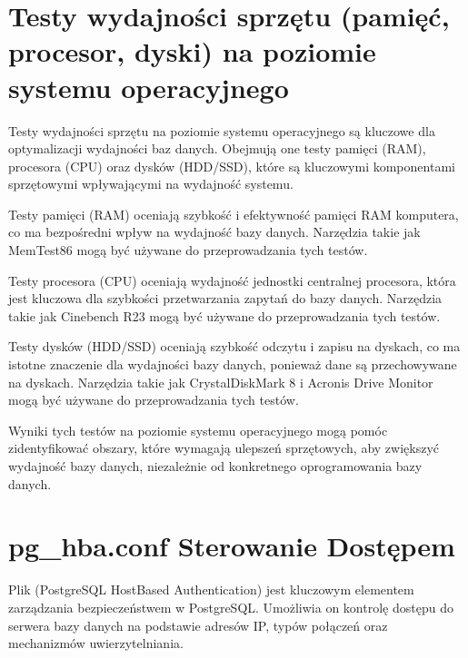 \documentclass[letterpaper,10pt,polish]{sphinxmanual}
\begin{document}
\chapter{Testy wydajności sprzętu (pamięć, procesor, dyski) na poziomie systemu operacyjnego}
\label{\detokenize{rozdzialy/rozdzial7:testy-wydajnosci-sprzetu-pamiec-procesor-dyski-na-poziomie-systemu-operacyjnego}}\label{\detokenize{rozdzialy/rozdzial7::doc}}
\sphinxAtStartPar
Testy wydajności sprzętu na poziomie systemu operacyjnego są kluczowe dla optymalizacji wydajności baz danych. Obejmują one testy pamięci (RAM), procesora (CPU) oraz dysków (HDD/SSD), które są kluczowymi komponentami sprzętowymi wpływającymi na wydajność systemu.

\sphinxAtStartPar
Testy pamięci (RAM) oceniają szybkość i efektywność pamięci RAM komputera, co ma bezpośredni wpływ na wydajność bazy danych. Narzędzia takie jak MemTest86 mogą być używane do przeprowadzania tych testów.

\sphinxAtStartPar
Testy procesora (CPU) oceniają wydajność jednostki centralnej procesora, która jest kluczowa dla szybkości przetwarzania zapytań do bazy danych. Narzędzia takie jak Cinebench R23 mogą być używane do przeprowadzania tych testów.

\sphinxAtStartPar
Testy dysków (HDD/SSD) oceniają szybkość odczytu i zapisu na dyskach, co ma istotne znaczenie dla wydajności bazy danych, ponieważ dane są przechowywane na dyskach. Narzędzia takie jak CrystalDiskMark 8 i Acronis Drive Monitor mogą być używane do przeprowadzania tych testów.

\sphinxAtStartPar
Wyniki tych testów na poziomie systemu operacyjnego mogą pomóc zidentyfikować obszary, które wymagają ulepszeń sprzętowych, aby zwiększyć wydajność bazy danych, niezależnie od konkretnego oprogramowania bazy danych.

\sphinxstepscope


\chapter{pg\_hba.conf \sphinxhyphen{} Sterowanie Dostępem}
\label{\detokenize{sprawozdanie/source/rozdzialy/rozdzial1:pg-hba-conf-sterowanie-dostepem}}\label{\detokenize{sprawozdanie/source/rozdzialy/rozdzial1::doc}}
\sphinxAtStartPar
Plik  (PostgreSQL Host\sphinxhyphen{}Based Authentication) jest
kluczowym elementem zarządzania bezpieczeństwem w PostgreSQL. Umożliwia
on kontrolę dostępu do serwera bazy danych na podstawie adresów IP,
typów połączeń oraz mechanizmów uwierzytelniania.
\end{document}
